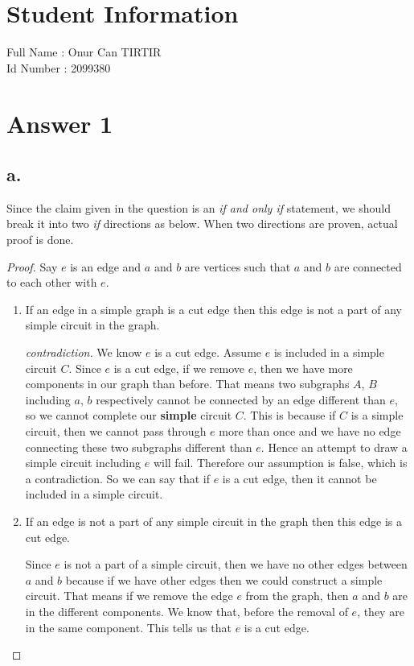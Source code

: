 \documentclass[12pt]{article}
\begin{document}
\section*{Student Information } 
Full Name :  Onur Can TIRTIR\\
Id Number :  2099380\\

\section*{Answer 1}

\subsection*{a.}
Since the claim given in the question is an \textit{if and only if} statement, we should break it into two \textit{if} directions as below. When two directions are proven, actual proof is done.

\begin{proof}
Say $e$ is an edge and $a$ and $b$ are vertices such that $a$ and $b$ are connected to each other with $e$.
\begin{enumerate}
\item{If an edge in a simple graph is a cut edge then this edge is not a part of any simple circuit in the graph.}

\textit{contradiction.} We know $e$ is a cut edge. Assume $e$ is included in a simple circuit $C$. Since $e$ is a cut edge, if we remove $e$, then we have more components in our graph than before. That means two subgraphs $A$, $B$ including $a$, $b$ respectively cannot be connected by an edge different than $e$, so we cannot complete our \textbf{simple} circuit $C$. This is because if $C$ is a simple circuit, then we cannot pass through $e$ more than once and we have no edge connecting these two subgraphs different than $e$. Hence an attempt to draw a simple circuit including $e$ will fail. Therefore our assumption is false, which is a contradiction. So we can say that if $e$ is a cut edge, then it cannot be included in a simple circuit.
\item{If an edge is not a part of any simple circuit in the graph then this edge is a cut edge.}

Since $e$ is not a part of a simple circuit, then we have no other edges between $a$ and $b$ because if we have other edges then we could construct a simple circuit. That means if we remove the edge $e$ from the graph, then $a$ and $b$ are in the different components. We know that, before the removal of $e$, they are in the same component. This tells us that $e$ is a cut edge.            
\end{enumerate}
\end{proof}
\end{document}
